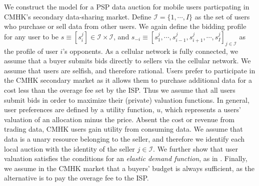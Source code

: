 \documentclass[sigconf, anonymous]{acmart}
\newcommand{\mcI}{\mathcal{I}}
\theoremstyle{definition}
\begin{document}
We construct the model for a PSP data auction for mobile users
particpating in CMHK's secondary data-sharing market.
Define $\mcI = \lbrace 1, \cdots, I\rbrace$ as the set of users who purchase or sell
data from other users. We again define the bidding profile for any user to be 
$s \equiv
[s_i^j] \in \mcI \times \mcI$, and $s_{-i} \equiv [s_1^j , \cdots , s_{i-1}^j , s_{i+1}^j , \cdots
, s_I^j]_{j\in\mcI}$ as the profile of user $i$'s opponents. 
As a cellular network is fully connected, we assume that a buyer submits bids directly to sellers via the
cellular network. We assume that users are selfish, and therefore
rational. 
Users prefer to participate in the CMHK secondary market as it allows them to purchase
additional data for a cost less than the overage fee set by the ISP. 
Thus we assume that all users submit bids in order to maximize their
(private) valuation functions. 
In general, user preferences are defined by a utility function, $u$, which 
represents a users' valuation of an allocation minus the price.
Absent the cost or revenue from trading data, CMHK users gain utility from consuming
data. 
We assume that data is a unary resource belonging to the seller, and
therefore we identify each local auction with the identity of the seller
$j\in\mcI$.
We further show that user valuation satisfies the conditions for an
\emph{elastic demand function}, as in \cite{lazar}.
Finally, we assume in the CMHK market that a buyers' budget is always
sufficient, as the alternative is to pay the overage fee to the ISP.
\end{document}
